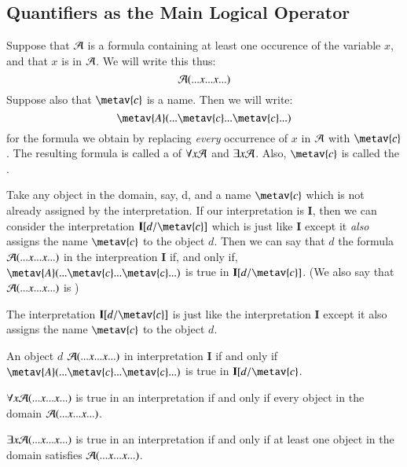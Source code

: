 \documentclass[12pt, a4paper, twoside, openright, titlepage]{book}
\begin{document}
\subsection{\textsection Quantifiers as the Main Logical Operator}

\begin{defn}{}{}
    Suppose that $\mathcal{A}$ is a formula containing at least one occurence of the variable $x$, and that $x$ is  in $\mathcal{A}$. We will write this thus:\begin{equation*}
        \mathcal{A}(...x...x...)
    \end{equation*}
    Suppose also that $\metav{c}$ is a name. Then we will write:\begin{equation*}
        \metav{A}(...\metav{c}...\metav{c}...)
    \end{equation*}
    for the formula we obtain by replacing \emph{every} occurrence of $x$ in $\mathcal{A}$ with $\metav{c}$. The resulting formula is called a  of $\forall x\mathcal{A}$ and $\exists x\mathcal{A}$. Also, $\metav{c}$ is called the .
\end{defn}


\begin{defn}{}{}
    Take any object in the domain, say, d, and a name $\metav{c}$ which is not already assigned by the interpretation. If our interpretation is $\mathbf{I}$, then we can consider the interpretation $\mathbf{I}[d/\metav{c}]$ which is just like $\mathbf{I}$ except it \emph{also} assigns the name $\metav{c}$ to the object $d$. Then we can say that $d$  the formula $\mathcal{A}(...x...x...)$ in the interpreation $\mathbf{I}$ if, and only if, $\metav{A}(...\metav{c}...\metav{c}...)$ is true in $\mathbf{I}[d/\metav{c}]$. (We also say that $\mathcal{A}(...x...x...)$ is )
\end{defn}


\begin{defn}{}{}
    The interpretation $\mathbf{I}[d/\metav{c}]$ is just like the interpretation $\mathbf{I}$ except it also assigns the name $\metav{c}$ to the object $d$.


    An object $d$  $\mathcal{A}(...x...x...)$ in interpretation $\mathbf{I}$ if and only if $\metav{A}(...\metav{c}...\metav{c}...)$ is true in $\mathbf{I}[d/\metav{c}$.
\end{defn}

\begin{defn}{}{}
    $\forall x\mathcal{A}(...x...x...)$ is true in an interpretation if and only if every object in the domain  $\mathcal{A}(...x...x...)$.


    $\exists x \mathcal{A}(...x...x...)$ is true in an interpretation if and only if at least one object in the domain satisfies $\mathcal{A}(...x...x...)$.
\end{defn}
\end{document}
